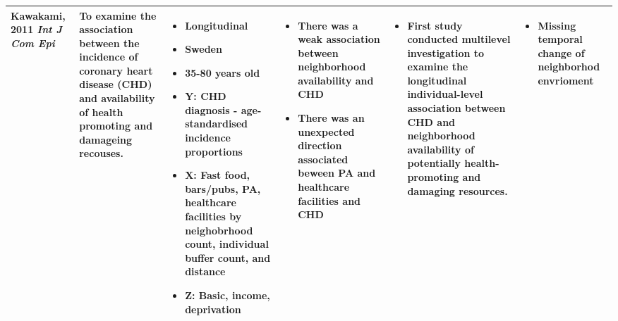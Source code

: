\documentclass{article}
\begin{document}
\begin{longtable}[ht!]{ m{2cm} m{4cm} m{6cm} m{5cm} m{4cm} m{3cm} }
	Kawakami, 2011 \textit{Int J Com Epi} &
	To examine the association between the incidence of coronary heart disease (CHD) and availability of health promoting and damageing recouses. &
	\begin{itemize}[noitemsep,topsep=0pt] \item Longitudinal \item Sweden \item 35-80 years old \item Y: CHD diagnosis - age-standardised incidence proportions \item X: Fast food, bars/pubs, PA, healthcare facilities by neighobrhood count, individual buffer count, and distance \item Z: Basic, income, deprivation
	\end{itemize} &
	\begin{itemize}[noitemsep,topsep=0pt] \item There was a weak association between neighborhood availability and CHD \item There was an unexpected direction associated beween PA and healthcare facilities and CHD
	\end{itemize} &
	\begin{itemize}[noitemsep,topsep=0pt] \item First study conducted multilevel investigation to examine the longitudinal individual-level association between CHD and neighborhood availability of potentially health-promoting and damaging resources.
	\end{itemize} &
	\begin{itemize}[noitemsep,topsep=0pt] \item Missing temporal change of neighborhod envrioment 
	\end{itemize} \\
	\hline


\end{longtable}

	
\end{document}
